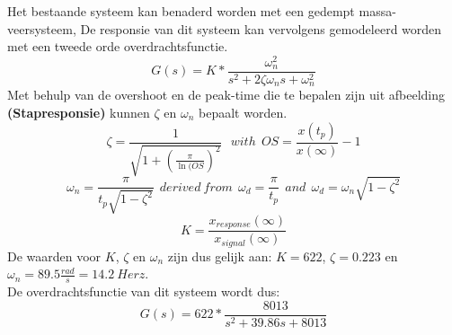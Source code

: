 \documentclass[a4paper]{article}
\begin{document}
Het bestaande systeem kan benaderd worden met een gedempt massa-veersysteem, De responsie van dit systeem kan vervolgens gemodeleerd worden met een tweede orde overdrachtsfunctie. 
\begin{equation}
G(s) = K * \frac{\omega_n^2}{s^2 + 2 \zeta \omega_n s + \omega_n^2}
\end{equation}
Met behulp van de overshoot en de peak-time die te bepalen zijn uit afbeelding \textbf{(Stapresponsie)} kunnen $\zeta$ en $\omega_n$ bepaalt worden.
\begin{equation}
\zeta = \frac{1}{\sqrt{1 + (\frac{\pi}{\ln(OS})^2}} \ \ \ with \ \ OS = \frac{x(t_p)}{x(\infty)} -1
\end{equation}
\begin{equation}
\omega_n = \frac{\pi}{t_p \sqrt{1 - \zeta^2}} \ \ derived \ from \ \ \omega_d = \frac{\pi}{t_p} \ \ and \ \ \omega_d = \omega_n \sqrt{1-\zeta^2}
\end{equation}
\begin{equation}
K = \frac{x_{response}(\infty)}{x_{signal}(\infty)}
\end{equation}
De waarden voor $K$, $\zeta$ en $\omega_n$ zijn dus gelijk aan: $ K = 622$, 
$\zeta = 0.223$ en $\omega_n = 89.5 \frac{rad}{s} = 14.2 \ Herz$.\\
De overdrachtsfunctie van dit systeem wordt dus:
\begin{equation}
G(s) = 622 * \frac{8013}{s^2 + 39.86 s + 8013}
\end{equation}
\end{document}
